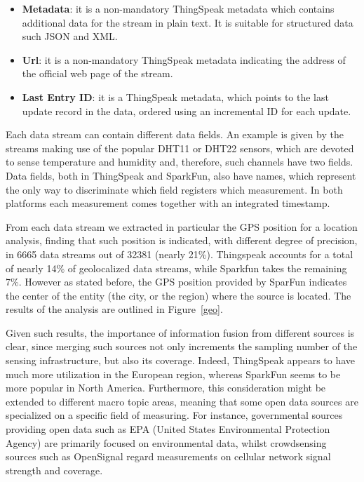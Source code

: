 \begin{itemize}
 \item \textbf{Metadata}: it is a non-mandatory ThingSpeak metadata which contains additional data for the stream in plain text. It is suitable for structured data such JSON and XML.
 \item \textbf{Url}: it is a non-mandatory ThingSpeak metadata indicating the address of the official web page of the stream.
 \item \textbf{Last Entry ID}: it is a ThingSpeak metadata, which points to the last update record in the data, ordered using an incremental ID for each update.
\end{itemize}

Each data stream can contain different data fields.
An example is given by the streams making use of the popular DHT11 or DHT22 sensors, which are devoted to sense temperature and humidity and, therefore, such channels have two fields.
Data fields, both in ThingSpeak and SparkFun, also have names, which represent the only way to discriminate which field registers which measurement.
In both platforms each measurement comes together with an integrated timestamp.

From each data stream we extracted in particular the GPS position for a location analysis, finding that such position is indicated, with different degree of precision, in 6665 data streams out of 32381 (nearly 21\%). Thingspeak accounts for a total of nearly 14\% of geolocalized data streams, while Sparkfun takes the remaining 7\%. However as stated before, the GPS position provided by SparFun indicates the center of the entity (the city, or the region) where the source is located.
The results of the analysis are outlined in Figure~\ref{geo}.

Given such results, the importance of information fusion from different sources is clear, since merging such sources not only increments the sampling number of the sensing infrastructure, but also its coverage.
Indeed, ThingSpeak appears to have much more utilization in the European region, whereas SparkFun seems to be more popular in North America.
Furthermore, this consideration might be extended to different macro topic areas, meaning that some open data sources are specialized on a specific field of measuring.
For instance, governmental sources providing open data such as EPA (United States Environmental Protection Agency) \cite{epa} are primarily focused on environmental data, whilst crowdsensing sources such as OpenSignal \cite{opensignal} regard measurements on cellular network signal strength and coverage.

